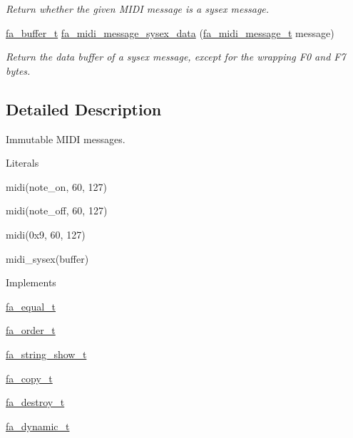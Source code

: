 \begin{DoxyCompactItemize}
\begin{DoxyCompactList}\small\item\em Return whether the given M\-I\-D\-I message is a sysex message. \end{DoxyCompactList}\item 
\hyperlink{group___fa_buffer_ga0ed7a1d783ab322e2e8be02432d0839e}{fa\-\_\-buffer\-\_\-t} \hyperlink{group___fa_midi_message_gabfe73e53a3d5a4e4fe5e03893d344b19}{fa\-\_\-midi\-\_\-message\-\_\-sysex\-\_\-data} (\hyperlink{group___fa_midi_message_gaa73293eb40a2cffdc2294e3cb6dc2564}{fa\-\_\-midi\-\_\-message\-\_\-t} message)
\begin{DoxyCompactList}\small\item\em Return the data buffer of a sysex message, except for the wrapping {\ttfamily F0} and {\ttfamily F7} bytes. \end{DoxyCompactList}\end{DoxyCompactItemize}


\subsection{Detailed Description}
Immutable M\-I\-D\-I messages. \begin{DoxyParagraph}{Literals}

\begin{DoxyItemize}
\item {\ttfamily midi(note\-\_\-on, 60, 127)}
\item {\ttfamily midi(note\-\_\-off, 60, 127)}
\item {\ttfamily midi(0x9, 60, 127)}
\item {\ttfamily midi\-\_\-sysex(buffer)}
\end{DoxyItemize}
\end{DoxyParagraph}
\begin{DoxyParagraph}{Implements }

\begin{DoxyItemize}
\item \hyperlink{structfa__equal__t}{fa\-\_\-equal\-\_\-t}
\item \hyperlink{structfa__order__t}{fa\-\_\-order\-\_\-t}
\item \hyperlink{structfa__string__show__t}{fa\-\_\-string\-\_\-show\-\_\-t}
\item \hyperlink{structfa__copy__t}{fa\-\_\-copy\-\_\-t}
\item \hyperlink{structfa__destroy__t}{fa\-\_\-destroy\-\_\-t}
\item \hyperlink{structfa__dynamic__t}{fa\-\_\-dynamic\-\_\-t} 
\end{DoxyItemize}
\end{DoxyParagraph}


